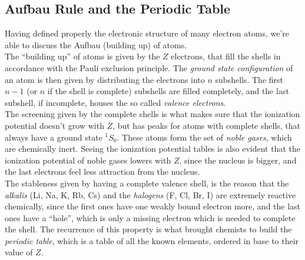 \documentclass[a4paper, 11pt]{book}
\newcommand{\1}{\opr{\mathds{1}}}
\theoremstyle{plain}
\begin{document}
	\subsection{Aufbau Rule and the Periodic Table}
	Having defined properly the electronic structure of many electron atoms, we're able to discuss the Aufbau (building up) of atoms.\\
	The ``building up'' of atoms is given by the $Z$ electrons, that fill the shells in accordance with the Pauli exclusion principle. The \textit{ground state configuration} of an atom is then given by distributing the electrons into $n$ subshells. The first $n-1$ (or $n$ if the shell is complete) subshells are filled completely, and the last subshell, if incomplete, houses the so called \textit{valence electrons}.\\
	The screening given by the complete shells is what makes sure that the ionization potential doesn't grow with $Z$, but has peaks for atoms with complete shells, that always have a ground state $^1S_0$. These atoms form the set of \textit{noble gases}, which are chemically inert. Seeing the ionization potential tables is also evident that the ionization potential of noble gases lowers with $Z$, since the nucleus is bigger, and the last electrons feel less attraction from the nucleus.\\
	The stableness given by having a complete valence shell, is the reason that the \textit{alkalis} (Li, Na, K, Rb, Cs) and the \textit{halogens} (F, Cl, Br, I) are extremely reactive chemically, since the first ones have one weakly bound electron more, and the last ones have a ``hole'', which is only a missing electron which is needed to complete the shell. The recurrence of this property is what brought chemists to build the \textit{periodic table}, which is a table of all the known elements, ordered in base to their value of $Z$.
\end{document}
